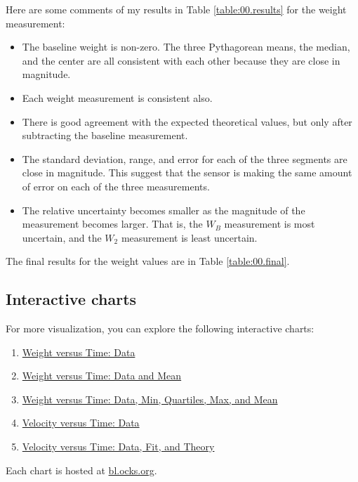 Here are some comments of my results in Table \ref{table:00.results} for the weight measurement:
\begin{itemize}
    \item The baseline weight is non-zero. The three Pythagorean means, the median, and the center are all consistent with each other because they are close in magnitude.
    \item Each weight measurement is consistent also.
    \item There is good agreement with the expected theoretical values, but only after subtracting the baseline measurement.
    \item The standard deviation, range, and error for each of the three segments are close in magnitude. This suggest that the sensor is making the same amount of error on each of the three measurements.
    \item The relative uncertainty becomes smaller as the magnitude of the measurement becomes larger. That is, the $W_{B}$ measurement is most uncertain, and the $W_{2}$ measurement is least uncertain.
\end{itemize}
The final results for the weight values are in Table \ref{table:00.final}.
\subsection{Interactive charts}
For more visualization, you can explore the following interactive charts:
\begin{enumerate}
    \item \href{https://bl.ocks.org/meirizarrygelpi/4ff9e1ad0a6c6e7ccee79f7f41a793e6}{Weight versus Time: Data}
    \item \href{https://bl.ocks.org/meirizarrygelpi/1ef52b7ff946234fdc74aa956ccf83c9}{Weight versus Time: Data and Mean}
    \item \href{https://bl.ocks.org/meirizarrygelpi/faf2f927d6886b88b075ff7cdb631b30}{Weight versus Time: Data, Min, Quartiles, Max, and Mean}
    \item \href{https://bl.ocks.org/meirizarrygelpi/fd044bb826a7a8e4f141293fa4a64de9}{Velocity versus Time: Data}
    \item \href{https://bl.ocks.org/meirizarrygelpi/d7a581246c16a7763681e5cad1bcad48}{Velocity versus Time: Data, Fit, and Theory}
\end{enumerate}
Each chart is hosted at \href{https://bl.ocks.org/}{bl.ocks.org}.
